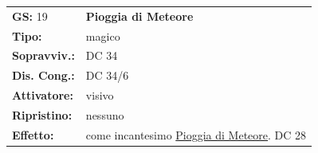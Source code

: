 \begin{multicols}{2}
\medskip

\noindent\begin{tabularx}{\linewidth}{lX}
\rowcolor{gray!20}	\textbf{GS:} 19 &\textbf{Pioggia di Meteore}\\
\textbf{Tipo:} & magico \\
\rowcolor{gray!20}	\textbf{Sopravviv.:} & DC 34 \\
\textbf{Dis. Cong.:} & DC 34/6 \\
\rowcolor{gray!20}	\textbf{Attivatore:} & visivo \\
\textbf{Ripristino:} & nessuno \\
\textbf{Effetto:} & come incantesimo \hyperlink{Pioggia di Meteore}{Pioggia di Meteore}. DC 28
\end{tabularx}\\

\end{multicols}

